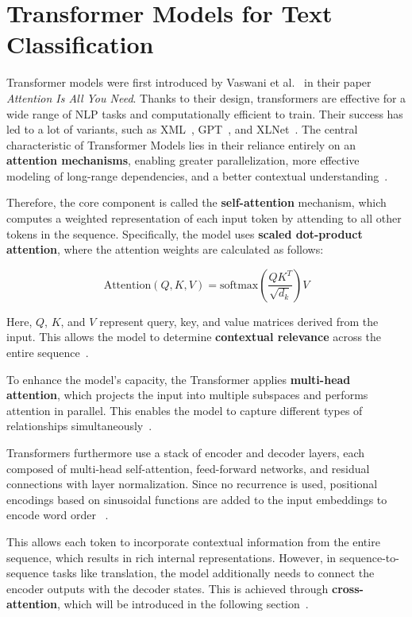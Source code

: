 \section{Transformer Models for Text Classification}

Transformer models were first introduced by Vaswani et al.~\cite{vaswani2017attention} in their paper \textit{Attention Is All You Need}. Thanks to their design, transformers are effective for a wide range of NLP tasks and computationally efficient to train. Their success has led to a lot of variants, such as XML~\cite{lample2019cross}, GPT~\cite{radford2018gpt}, and XLNet~\cite{yang2019xlnet}. The central characteristic of Transformer Models lies in their reliance entirely on an \textbf{attention mechanisms}, enabling greater parallelization, more effective modeling of long-range dependencies, and a better contextual understanding~\cite{vaswani2017attention}.

Therefore, the core component is called the \textbf{self-attention} mechanism, which computes a weighted representation of each input token by attending to all other tokens in the sequence. Specifically, the model uses \textbf{scaled dot-product attention}, where the attention weights are calculated as follows:

\[
\text{Attention}(Q, K, V) = \text{softmax}\left(\frac{QK^T}{\sqrt{d_k}}\right)V
\]

Here, $Q$, $K$, and $V$ represent query, key, and value matrices derived from the input. This allows the model to determine \textbf{contextual relevance} across the entire sequence~\cite{vaswani2017attention}.

To enhance the model's capacity, the Transformer applies \textbf{multi-head attention}, which projects the input into multiple subspaces and performs attention in parallel. This enables the model to capture different types of relationships simultaneously~\cite{vaswani2017attention}.

Transformers furthermore use a stack of encoder and decoder layers, each composed of multi-head self-attention, feed-forward networks, and residual connections with layer normalization. Since no recurrence is used, positional encodings based on sinusoidal functions are added to the input embeddings to encode word order ~\cite{vaswani2017attention}.

This allows each token to incorporate contextual information from the entire sequence, which results in rich internal representations. However, in sequence-to-sequence tasks like translation, the model additionally needs to connect the encoder outputs with the decoder states. This is achieved through \textbf{cross-attention}, which will be introduced in the following section~\cite{vaswani2017attention}.

